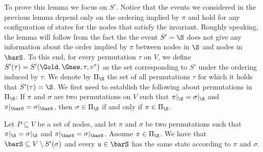 To prove this lemma we focus on $S'$. Notice that the events we considered in the previous lemma depend only on the ordering 
implied by $\pi$ and hold for any configuration of states for the nodes that satisfy the \MIS invariant. Roughly speaking, the lemma 
will follow from the fact the the event $S'=\S$ does not give any information about the order implied by $\pi$ between nodes in $\S$ 
and nodes in $\barS$. To this end, for every permutation $\tau$ on $V$, we define $S'(\tau) = S'(\Gold,\Gnew,\tau,v^*)$ as the set corresponding to $S'$ under the ordering induced by $\tau$. 
We denote by $\Pi_{\S}$ the set of all permutations $\tau$ for which it holds that $S'(\tau)=\S$. We first need to establish the 
following about permutations in $\Pi_{\S}$: If $\pi$ and $\sigma$ are two permutations on $V$ such that $\pi|_{\S}=\sigma|_{\S}$ 
and $\pi|_{\barS}=\sigma|_{\barS}$, then $\sigma\in\Pi_{\S}$ if and only if $\pi\in\Pi_{\S}$.



\begin{claim}
\label{claim:u-in-barS}
Let $P \subseteq V$ be a set of nodes, and let $\pi$ and $\sigma$ be two permutations such that $\pi|_{\S}=\sigma|_{\S}$ and $\pi|_{\barS}=\sigma|_{\barS}$. Assume $\pi \in \Pi_\S$. We have that $\barS \subseteq V \setminus S'(\sigma)$ and every $u \in \barS$ has the same state according to $\pi$ and $\sigma$.
\end{claim}

